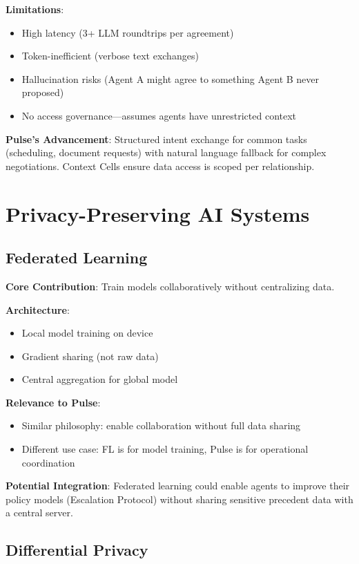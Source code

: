 \textbf{Limitations}:
\begin{itemize}
    \item High latency (3+ LLM roundtrips per agreement)
    \item Token-inefficient (verbose text exchanges)
    \item Hallucination risks (Agent A might agree to something Agent B never proposed)
    \item No access governance—assumes agents have unrestricted context
\end{itemize}

\textbf{Pulse's Advancement}: Structured intent exchange for common tasks (scheduling, document requests) with natural language fallback for complex negotiations. Context Cells ensure data access is scoped per relationship.

\section{Privacy-Preserving AI Systems}

\subsection{Federated Learning}

\textbf{Core Contribution}: Train models collaboratively without centralizing data.

\textbf{Architecture}:
\begin{itemize}
    \item Local model training on device
    \item Gradient sharing (not raw data)
    \item Central aggregation for global model
\end{itemize}

\textbf{Relevance to Pulse}:
\begin{itemize}
    \item Similar philosophy: enable collaboration without full data sharing
    \item Different use case: FL is for model training, Pulse is for operational coordination
\end{itemize}

\textbf{Potential Integration}: Federated learning could enable agents to improve their policy models (Escalation Protocol) without sharing sensitive precedent data with a central server.

\subsection{Differential Privacy}

